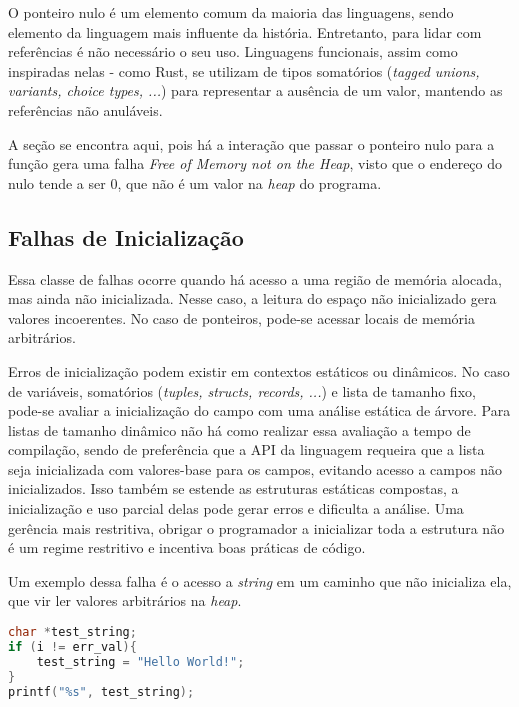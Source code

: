O ponteiro nulo é um elemento comum da maioria das linguagens, sendo elemento da linguagem mais influente da história. Entretanto, para lidar com referências é não necessário o seu uso. Linguagens funcionais, assim como inspiradas nelas - como Rust, se utilizam de tipos somatórios (\emph{tagged unions, variants, choice types, ...}) para representar a ausência de um valor, mantendo as referências não anuláveis.

A seção se encontra aqui, pois há a interação que passar o ponteiro nulo para a função \FREE gera uma falha \emph{Free of Memory not on the Heap}, visto que o endereço do nulo tende a ser 0, que não é um valor na \emph{heap} do programa.


\subsection{Falhas de Inicialização}
\label{sec:mem-error:init}

Essa classe de falhas ocorre quando há acesso a uma região de memória alocada, mas ainda não inicializada. Nesse caso, a leitura do espaço não inicializado gera valores incoerentes. No caso de ponteiros, pode-se acessar locais de memória arbitrários.

Erros de inicialização podem existir em contextos estáticos ou dinâmicos. No caso de variáveis, somatórios (\emph{tuples, structs, records, ...}) e lista de tamanho fixo, pode-se avaliar a inicialização do campo com uma análise estática de árvore. Para listas de tamanho dinâmico não há como realizar essa avaliação a tempo de compilação, sendo de preferência que a API da linguagem requeira que a lista seja inicializada com valores-base para os campos, evitando acesso a campos não inicializados. Isso também se estende as estruturas estáticas compostas, a inicialização e uso parcial delas pode gerar erros e dificulta a análise. Uma gerência mais restritiva, obrigar o programador a inicializar toda a estrutura não é um regime restritivo e incentiva boas práticas de código.

Um exemplo dessa falha é o acesso a \emph{string} em um caminho que não inicializa ela, que vir ler valores arbitrários na \emph{heap}.

\begin{lstlisting}[language=C, label={lst:initialization}, caption=Exemplo de uma Falha de Inicalização com Strings]
char *test_string;
if (i != err_val){
	test_string = "Hello World!";
}
printf("%s", test_string);
\end{lstlisting}



